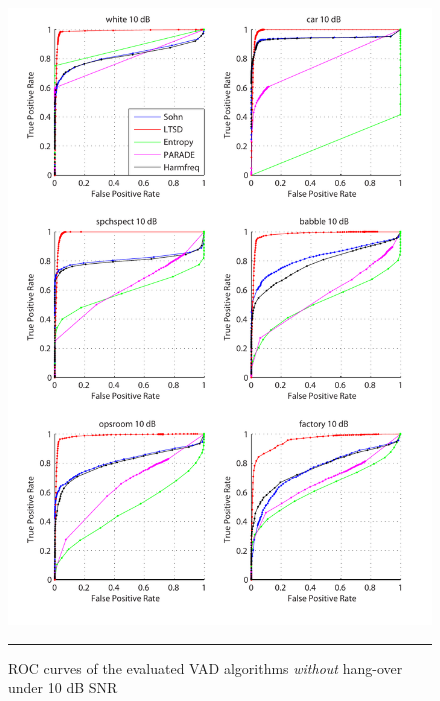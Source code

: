 \begin{figure}[htbp]
	\centering
		\includegraphics[width=1.0\columnwidth]{Figures/Chapter4/10dBnoh.pdf}
		\rule{37em}{0.5pt}
	\caption[ROC curves of the evaluated algorithms \emph{without} hang-over under 10 dB SNR]{ROC curves of the evaluated VAD algorithms \emph{without} hang-over under 10 dB SNR}
	\label{fig:10dBnoh}
\end{figure}